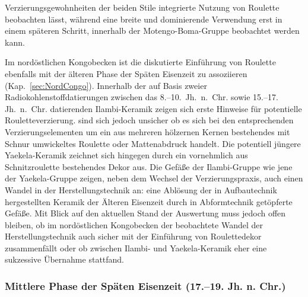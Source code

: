 Verzierungsgewohnheiten der beiden Stile integrierte Nutzung von Roulette beobachten lässt, während eine breite und dominierende Verwendung erst in einem späteren Schritt, innerhalb der Motengo-Boma-Gruppe beobachtet werden kann.

Im nordöstlichen Kongobecken ist die diskutierte Einführung von Roulette ebenfalls mit der älteren Phase der Späten Eisenzeit zu assoziieren (Kap.~\ref{sec:NordCongo}). Innerhalb der auf Basis zweier Radiokohlenstoffdatierungen zwischen das 8.--10.~Jh.~n.~Chr. sowie 15.--17. Jh.~n.~Chr. datierenden Ilambi-Keramik zeigen sich erste Hinweise für potentielle Rouletteverzierung. \textcite[17, 19 Abb.~26]{LivingstoneSmith.2017} sind sich jedoch unsicher ob es sich bei den entsprechenden Verzierungselementen um ein aus mehreren hölzernen Kernen bestehendes mit Schnur umwickeltes Roulette oder Mattenabdruck handelt. Die potentiell jüngere Yaekela-Keramik zeichnet sich hingegen durch ein vornehmlich aus Schnitzroulette bestehendes Dekor aus. Die Gefäße der Ilambi-Gruppe wie jene der Yaekela-Gruppe zeigen, neben dem Wechsel der Verzierungspraxis, auch einen Wandel in der Herstellungstechnik an: eine Ablösung der in Aufbautechnik hergestellten Keramik der Älteren Eisenzeit durch in Abformtechnik getöpferte Gefäße. Mit Blick auf den aktuellen Stand der Auswertung muss jedoch offen bleiben, ob im nordöstlichen Kongobecken der beobachtete Wandel der Herstellungstechnik auch sicher mit der Einführung von Roulettedekor zusammenfällt oder ob zwischen Ilambi- und Yaekela-Keramik eher eine sukzessive Übernahme stattfand.

\subsubsection*{Mittlere Phase der Späten Eisenzeit (17.--19. Jh. n. Chr.)}

